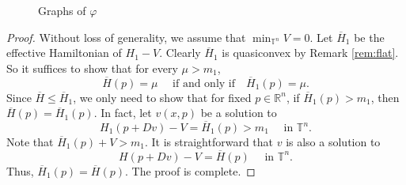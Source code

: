 \documentclass[12pt,reqno]{amsart}
\theoremstyle{plain}
\theoremstyle{remark}
\numberwithin{equation}{section}
\newcommand{\R}{\mathbb{R}}
\newcommand{\T}{\mathbb{T}}
\newcommand{\ol}{\overline}
\begin{document}
\begin{figure}[h]
\begin{center}
\caption{Graphs of $\varphi$}
\label{fig6}
\end{center}
\end{figure}



\begin{proof}
Without loss of generality,  we assume that $\min_{\T^n}V=0$. Let $\ol{H}_1$ be the effective Hamiltonian of $H_1-V$. 
Clearly $\ol{H}_1$ is quasiconvex by  Remark  \ref{rem:flat}.  So  it  suffices to show that for every $\mu>m_1$,  
$$
\ol H(p)=\mu   \quad \text{ if and only if}  \quad \ol H_1(p)=\mu.
$$
Since $\ol H\leq \ol H_1$,  we only need to show that  for fixed  $p \in \R^n$, if $\ol H_1(p)>m_1$, then $\ol H(p)=\ol H_1(p)$.   In fact,  let $v(x,p)$ be a solution to
\[
H_1(p+Dv) - V = \ol{H}_1(p)> m_1 \quad \text{ in } \T^n.
\]
Note that $\ol{H}_1(p)+V>m_1$.
It is straightforward that $v$ is also a solution to 
\[
H(p+Dv) - V = \ol{H}(p) \quad \text{ in } \T^n.
\]
Thus, $\ol{H}_1(p)=\ol{H}(p)$. The proof is complete.
\end{proof}
\end{document}
